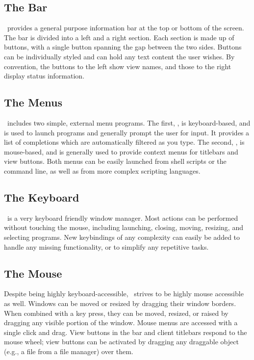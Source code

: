 \subsection{The Bar}

\wmii\ provides a general purpose information bar at the top or
bottom of the screen. The bar is divided into a left and a right
section. Each section is made up of buttons, with a single
button spanning the gap between the two sides. Buttons can be
individually styled and can hold any text content the user
wishes. By convention, the buttons to the left show view names,
and those to the right display status information.

\subsection{The Menus}

\wmii\ includes two simple, external menu programs. The first,
\wimenu, is keyboard-based, and is used to launch programs and
generally prompt the user for input. It provides a list of
completions which are automatically filtered as you type. The
second, \wiIXmenu, is mouse-based, and is generally used to
provide context menus for titlebars and view buttons. Both menus
can be easily launched from shell scripts or the command line,
as well as from more complex scripting languages.

\subsection{The Keyboard}

\wmii\ is a very keyboard friendly window manager. Most actions
can be performed without touching the mouse, including
launching, closing, moving, resizing, and selecting programs.
New keybindings of any complexity can easily be added to handle
any missing functionality, or to simplify any repetitive tasks.

\subsection{The Mouse}

Despite being highly keyboard-accessible, \wmii\ strives to be
highly mouse accessible as well. Windows can be moved or resized
by dragging their window borders. When combined with a key
press, they can be moved, resized, or raised by dragging any
visible portion of the window. Mouse menus are accessed with a
single click and drag. View buttons in the bar and client
titlebars respond to the mouse wheel; view buttons can be
activated by dragging any draggable object (e.g., a file from a
file manager) over them.


